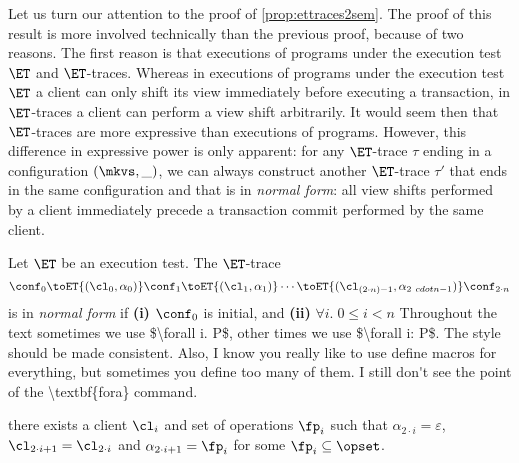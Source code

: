Let us turn our attention to the proof of \cref{prop:ettraces2sem}. The proof of this result is more involved 
technically than the previous proof, because of two reasons. The first reason is that  
executions of programs under the execution test $\ET$ and $\ET$-traces. Whereas in executions of 
programs under the execution test $\ET$
a client can only shift its view immediately before executing a transaction, in $\ET$-traces a client 
can perform a view shift arbitrarily. It would seem then that $\ET$-traces are more expressive than 
executions of programs. However, this difference in expressive power is only apparent: for any 
$\ET$-trace $\tau$ ending in a configuration $(\mkvs, \_)$, we can always construct another 
$\ET$-trace $\tau'$ that ends in the same configuration and that is in \emph{normal form}: 
all view shifts performed by a client immediately precede a transaction commit performed by 
the same client.

%
\begin{definition}
Let $\ET$ be an execution test. The $\ET$-trace
\[
\conf_0 \toET{(\cl_{0}, \alpha_0)} \conf_1 \toET{(\cl_1, \alpha_1)} \cdots \toET{(\cl_{(2\cdot n) - 1}, \alpha_{2\ cdot n - 1})} \conf_{2 \cdot n}
\]
is in \emph{normal form} if \textbf{(i)} $\conf_0$ is initial, and 
\textbf{(ii)} $\forall  i.\; 0 \leq i < n$ 
\ac{Throughout the text sometimes we use $\forall i. P$, other times we use $\forall i: P$. The style should be 
made consistent. Also, I know you really like to use define macros for everything, but sometimes you define too 
many of them. I still don't see the point of the \textbf{fora} command.}

there exists a client $\cl_i$ and set of operations $\fp_{i}$ such that 
$\alpha_{2 \cdot i} = \varepsilon$, $\cl_{2 \cdot i + 1} = \cl_{2 \cdot i}$ and $\alpha_{2 \cdot i + 1} = \fp_{i}$ for some $\fp_{i} \subseteq \opset$.
\end{definition}



